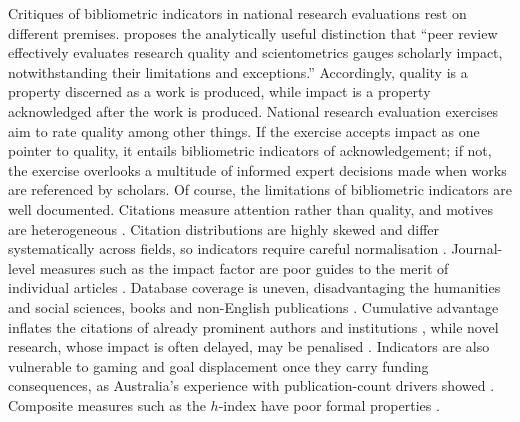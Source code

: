 Critiques of bibliometric indicators in national research evaluations rest on different premises. \citet[p.~3]{abramoForcedBattlePeerreview2024} proposes the analytically useful distinction that \enquote{peer review effectively evaluates research quality and scientometrics gauges scholarly impact, notwithstanding their limitations and exceptions.} Accordingly, quality is a property discerned as a work is produced, while impact is a property acknowledged after the work is produced. National research evaluation exercises aim to rate quality among other things. If the exercise accepts impact as one pointer to quality, it entails bibliometric indicators of acknowledgement; if not, the exercise overlooks a multitude of informed expert decisions made when works are referenced by scholars. Of course, the limitations of bibliometric indicators are well documented. Citations measure attention rather than quality, and motives are heterogeneous \citep{bornmannWhatCitationCounts2008, tahamtanWhatCitationCounts2019}. Citation distributions are highly skewed and differ systematically across fields, so indicators require careful normalisation \citep{waltmanSystematicEmpiricalComparison2013}. Journal-level measures such as the impact factor are poor guides to the merit of individual articles \citep{seglen1997why}. Database coverage is uneven, disadvantaging the humanities and social sciences, books and non-English publications \citep{mongeonJournalCoverageWeb2016}. Cumulative advantage inflates the citations of already prominent authors and institutions \citep{mertonMatthewEffectScience1968}, while novel research, whose impact is often delayed, may be penalised \citep{wangBiasNoveltyScience2017}. Indicators are also vulnerable to gaming and goal displacement once they carry funding consequences, as Australia's experience with publication-count drivers showed \citep{butlerExplainingAustraliasIncreased2003, biagioliGamingMetricsMisconduct2020}. Composite measures such as the $h$-index have poor formal properties \citep{waltmanInconsistencyHindex2012}.

